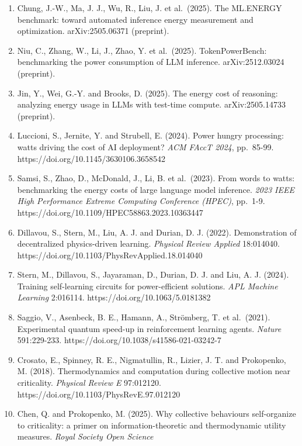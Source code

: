 \documentclass[
  10pt,
]{article}
\begin{document}
\begin{enumerate}
{  (HPCA)}, 1201-1216. https://doi.org/10.1109/HPCA61900.2025.00092.
  arXiv:2410.12032.
\item
  Chung, J.-W., Ma, J. J., Wu, R., Liu, J. et al.~(2025). The ML.ENERGY
  benchmark: toward automated inference energy measurement and
  optimization. arXiv:2505.06371 (preprint).
\item
  Niu, C., Zhang, W., Li, J., Zhao, Y. et al.~(2025). TokenPowerBench:
  benchmarking the power consumption of LLM inference. arXiv:2512.03024
  (preprint).
\item
  Jin, Y., Wei, G.-Y. and Brooks, D. (2025). The energy cost of
  reasoning: analyzing energy usage in LLMs with test-time compute.
  arXiv:2505.14733 (preprint).
\item
  Luccioni, S., Jernite, Y. and Strubell, E. (2024). Power hungry
  processing: watts driving the cost of AI deployment? \emph{ACM FAccT
  2024}, pp.~85-99. https://doi.org/10.1145/3630106.3658542
\item
  Samsi, S., Zhao, D., McDonald, J., Li, B. et al.~(2023). From words to
  watts: benchmarking the energy costs of large language model
  inference. \emph{2023 IEEE High Performance Extreme Computing
  Conference (HPEC)}, pp.~1-9.
  https://doi.org/10.1109/HPEC58863.2023.10363447
\item
  Dillavou, S., Stern, M., Liu, A. J. and Durian, D. J. (2022).
  Demonstration of decentralized physics-driven learning. \emph{Physical
  Review Applied} 18:014040.
  https://doi.org/10.1103/PhysRevApplied.18.014040
\item
  Stern, M., Dillavou, S., Jayaraman, D., Durian, D. J. and Liu, A. J.
  (2024). Training self-learning circuits for power-efficient solutions.
  \emph{APL Machine Learning} 2:016114.
  https://doi.org/10.1063/5.0181382
\item
  Saggio, V., Asenbeck, B. E., Hamann, A., Strömberg, T. et al.~(2021).
  Experimental quantum speed-up in reinforcement learning agents.
  \emph{Nature} 591:229-233. https://doi.org/10.1038/s41586-021-03242-7
\item
  Crosato, E., Spinney, R. E., Nigmatullin, R., Lizier, J. T. and
  Prokopenko, M. (2018). Thermodynamics and computation during
  collective motion near criticality. \emph{Physical Review E}
  97:012120. https://doi.org/10.1103/PhysRevE.97.012120
\item
  Chen, Q. and Prokopenko, M. (2025). Why collective behaviours
  self-organize to criticality: a primer on information-theoretic and
  thermodynamic utility measures. \emph{Royal Society Open Science}

\end{enumerate}
\end{document}
